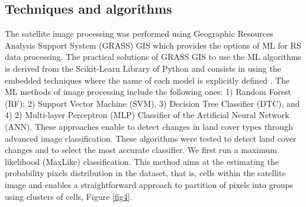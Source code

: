 \documentclass[jimaging,article,submit,pdftex,moreauthors]{Definitions/mdpi}
\begin{document}
\subsection{Techniques and algorithms}

The satellite image processing was performed using Geographic Resources Analysis Support System (GRASS) GIS which provides the options of ML for RS data processing. The practical solutions of GRASS GIS to use the ML algorithms is derived from the Scikit-Learn Library of Python \cite{scikitlearn} and consists in using the embedded techniques where the name of each model is explicitly defined \cite{rs17050822,LEMENKOVA2025100180,geosciences15030104}. The ML methods of image processing include the following ones: 1) Random Forest (RF); 2) Support Vector Machine (SVM), 3) Decision Tree Classifier (DTC), and 4) 2) Multi-layer Perceptron (MLP) Classifier of the Artificial Neural Network (ANN). {These} approaches enable to detect changes in land cover types {through advanced image classification}. These algorithms were tested to detect land cover changes {and to select the most accurate classifier}. {We first run a maximum likelihood (MaxLike) classification. This method aims at the estimating the probability pixels distribution in the dataset, that is, cells within the satellite image and enables a straightforward approach to partition of pixels into groups using clusters of cells}, Figure \ref{fig4}. 
\end{document}
